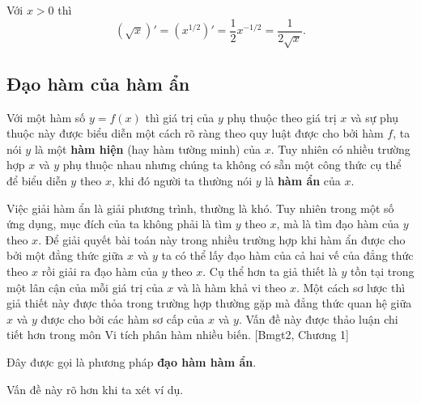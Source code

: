\begin{example}
    Với $x>0$ thì
    \[ (\sqrt{x})' = (x^{1/2})' = \dfrac{1}{2}x^{-1/2} = \dfrac{1}{2\sqrt{x}}. \]
\end{example}

\subsection{Đạo hàm của hàm ẩn}

Với một hàm số $y = f(x)$ thì giá trị của $y$ phụ thuộc theo giá trị $x$ và sự phụ thuộc này được biểu diễn một cách rõ ràng theo quy luật được cho bởi hàm $f$, ta nói $y$ là một \textbf{hàm hiện} (hay hàm tường minh) của $x$. Tuy nhiên có nhiều trường hợp $x$ và $y$ phụ thuộc nhau nhưng chúng ta không có sẵn một công thức cụ thể để biểu diễn $y$ theo $x$, khi đó người ta thường nói $y$ là \textbf{hàm ẩn} của $x$.

Việc giải hàm ẩn là giải phương trình, thường là khó. Tuy nhiên trong một số ứng dụng, mục đích của ta không phải là tìm $y$ theo $x$, mà là tìm đạo hàm của $y$ theo $x$. Để giải quyết bài toán này trong nhiều trường hợp khi hàm ẩn được cho bởi một đẳng thức giữa $x$ và $y$ ta có thể lấy đạo hàm của cả hai vế của đẳng thức theo $x$ rồi giải ra đạo hàm của $y$ theo $x$. Cụ thể hơn ta giả thiết là $y$ tồn tại trong một lân cận của mỗi giá trị của $x$ và là hàm khả vi theo $x$. Một cách sơ lược thì giả thiết này được thỏa trong trường hợp thường gặp mà đẳng thức quan hệ giữa $x$ và $y$ được cho bởi các hàm sơ cấp của $x$ và $y$. Vấn đề này được thảo luận chi tiết hơn trong môn Vi tích phân hàm nhiều biến. [Bmgt2, Chương 1]


Đây được gọi là phương pháp \textbf{đạo hàm hàm ẩn}.

Vấn đề này rõ hơn khi ta xét ví dụ.

